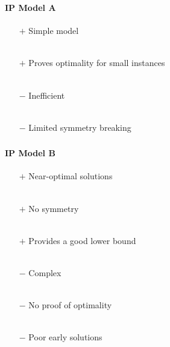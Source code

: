\documentclass{beamer}
\newcommand{\AutoSectionTitle}{}
\begin{document}


\begin{frame}
  \frametitle{\AutoSectionTitle}
  \framesubtitle{IP Model A}

  \begin{itemize}
  \item[$+$] Simple model \\~\\
  \item[$+$] Proves optimality for small instances \\~\\

    \pause
    
  \item[$-$] Inefficient \\~\\
  \item[$-$] Limited symmetry breaking
  \end{itemize}

\end{frame}




\begin{frame}
  \frametitle{\AutoSectionTitle}
  \framesubtitle{IP Model B}

  \begin{itemize}
  \item[$+$] Near-optimal solutions \\~\\
  \item[$+$] No symmetry \\~\\
  \item[$+$] Provides a good lower bound \\~\\

    \pause
    
  \item[$-$] Complex \\~\\
  \item[$-$] No proof of optimality \\~\\    
  \item[$-$] Poor early solutions
  \end{itemize}

\end{frame}


\end{document}
